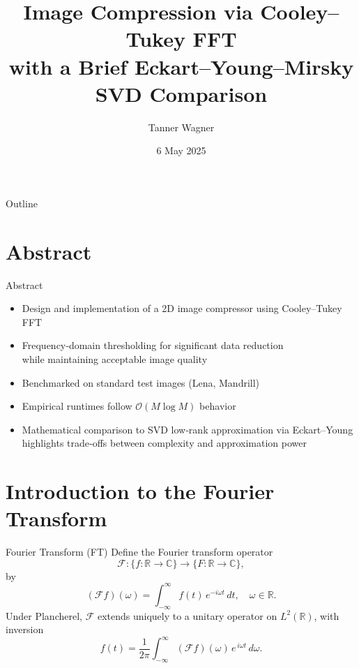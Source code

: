 \documentclass[12pt]{beamer}
\title[FFT \& SVD Image Compression]{Image Compression via Cooley–Tukey FFT\\with a Brief Eckart–Young–Mirsky SVD Comparison}
\author{Tanner Wagner}
\date{6 May 2025}
\begin{document}
\begin{frame}
  \titlepage
\end{frame}

\begin{frame}{Outline}
  \tableofcontents
\end{frame}

\section{Abstract}
\begin{frame}{Abstract}
  \begin{itemize}
    \item Design and implementation of a 2D image compressor using Cooley–Tukey FFT
    \item Frequency‐domain thresholding for significant data reduction \\
          while maintaining acceptable image quality
    \item Benchmarked on standard test images (Lena, Mandrill)
    \item Empirical runtimes follow $\mathcal{O}(M\log M)$ behavior
    \item Mathematical comparison to SVD low‐rank approximation via Eckart–Young
          highlights trade‐offs between complexity and approximation power
  \end{itemize}
\end{frame}

\section{Introduction to the Fourier Transform}

\begin{frame}{Fourier Transform (FT)}
  Define the Fourier transform operator
  \[
    \mathcal{F} : \bigl\{f\colon \mathbb{R}\to\mathbb{C}\bigr\}
    \rightarrow
    \bigl\{F\colon \mathbb{R}\to\mathbb{C}\bigr\},
  \]
  by
  \[
    (\mathcal{F}f)(\omega)
      = \int_{-\infty}^{\infty} f(t)\,e^{-i\omega t}\,dt,
    \quad \omega\in\mathbb{R}.
  \]
  Under Plancherel, $\mathcal{F}$ extends uniquely to a unitary operator on $L^2(\mathbb{R})$, with inversion
  \[
    f(t)
      = \frac{1}{2\pi}
        \int_{-\infty}^{\infty}
          (\mathcal{F}f)(\omega)\,e^{\,i\omega t}\,d\omega.
  \]
\end{frame}
\end{document}
